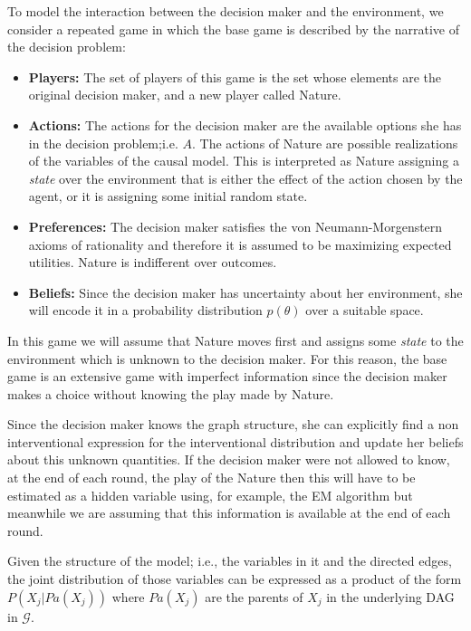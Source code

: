 \documentclass{article}
\begin{document}
To model the interaction between the decision maker and the environment, we consider a repeated game in which the base game is described by the narrative of the decision problem: 
\begin{itemize}
\item \textbf{Players:} The set of players of this game is the set whose elements are the original decision maker, and a new player called Nature.
\item \textbf{Actions:} The actions for the decision maker are the available options she has in the decision problem;i.e. $A$. The actions of Nature are possible realizations of the variables of the causal model. This is interpreted as Nature assigning a \textit{state} over the environment that is  either the effect of the action chosen by the agent, or it is assigning some initial random state.
\item \textbf{Preferences:} The decision maker satisfies the von Neumann-Morgenstern axioms of rationality and therefore it is assumed to be maximizing expected utilities. Nature is indifferent over outcomes.
\item \textbf{Beliefs:} Since the decision maker has uncertainty about her environment, she will encode it in a probability distribution $p(\theta)$ over a suitable space.
\end{itemize}

In this game we will assume that Nature moves first and assigns some \textit{state} to the environment which is unknown to the decision maker. For this reason, the base game is an extensive game with imperfect information since the decision maker makes a choice without knowing the play made by Nature.

Since the decision maker knows the graph structure, she can explicitly find a non interventional expression for the interventional distribution and update her beliefs about this unknown quantities. If the decision maker were not allowed to know, at the end of each round, the play of the Nature then this will have to be estimated as a hidden variable using, for example, the EM algorithm \cite{dempster1977maximum} but meanwhile we are assuming that this information is available at the end of each round.

Given the structure of the model; i.e., the variables in it and the directed edges, the joint distribution of those variables can be expressed as a product of the form $P(X_j | Pa(X_j))$ where $Pa(X_j)$ are the parents of $X_j$ in the underlying DAG in $\mathcal{G}$.
\end{document}
